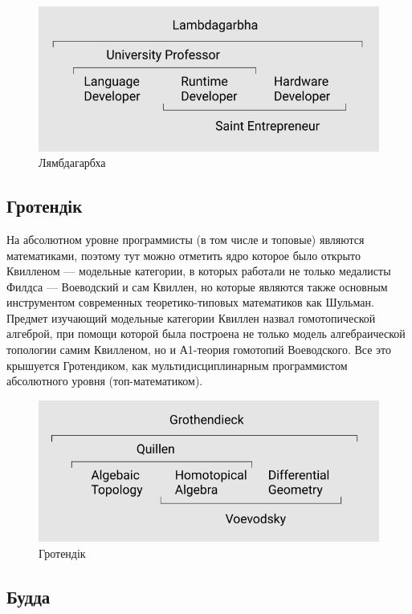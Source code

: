 \begin{figure}[!htbp]
\centerline{\includegraphics[scale=0.46]{lambdagarbha.PNG}}
\caption{Лямбдагарбха}
\end{figure}

\newpage
\subsection{Гротендік}

На абсолютном уровне программисты (в том числе и топовые) являются математиками, поэтому тут можно отметить ядро которое было открыто Квилленом — модельные категории, в которых работали не только медалисты Филдса — Воеводский и сам Квиллен, но которые являются также основным инструментом современных теоретико-типовых математиков как Шульман. Предмет изучающий модельные категории Квиллен назвал гомотопической алгеброй, при помощи которой была построена не только модель алгебраической топологии самим Квилленом, но и А1-теория гомотопий Воеводского. Все это крышуется Гротендиком, как мультидисциплинарным программистом абсолютного уровня (топ-математиком).

\begin{figure}[!htbp]
\centerline{\includegraphics[scale=0.46]{grothendieck.PNG}}
\caption{Гротендік}
\end{figure}

\newpage
\subsection{Будда}

